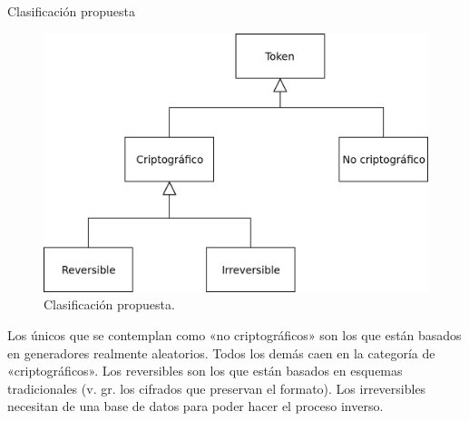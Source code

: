 \begin{frame}{Clasificación propuesta}

  \begin{figure}[H]
    \begin{center}
      \includegraphics[width=0.75\linewidth]
        {../../../diagramas_comunes/clasificacion/clasificacion_propia.png}
      \caption{Clasificación propuesta.}
    \end{center}
  \end{figure}

  \note
  {
    Los únicos que se contemplan como «no criptográficos» son los que
    están basados en generadores realmente aleatorios. Todos los demás
    caen en la categoría de «criptográficos». Los reversibles son los que
    están basados en esquemas tradicionales (v. gr. los cifrados que
    preservan el formato). Los irreversibles necesitan de una base de datos
    para poder hacer el proceso inverso.
  }

\end{frame}
